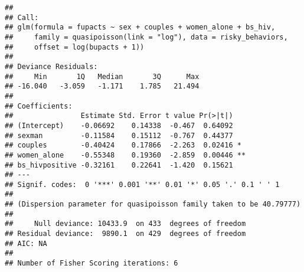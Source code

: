 \documentclass[]{article}
\begin{document}
\begin{verbatim}
## 
## Call:
## glm(formula = fupacts ~ sex + couples + women_alone + bs_hiv, 
##     family = quasipoisson(link = "log"), data = risky_behaviors, 
##     offset = log(bupacts + 1))
## 
## Deviance Residuals: 
##     Min       1Q   Median       3Q      Max  
## -16.040   -3.059   -1.171    1.785   21.494  
## 
## Coefficients:
##                Estimate Std. Error t value Pr(>|t|)   
## (Intercept)    -0.06692    0.14338  -0.467  0.64092   
## sexman         -0.11584    0.15112  -0.767  0.44377   
## couples        -0.40424    0.17866  -2.263  0.02416 * 
## women_alone    -0.55348    0.19360  -2.859  0.00446 **
## bs_hivpositive -0.32161    0.22641  -1.420  0.15621   
## ---
## Signif. codes:  0 '***' 0.001 '**' 0.01 '*' 0.05 '.' 0.1 ' ' 1
## 
## (Dispersion parameter for quasipoisson family taken to be 40.79777)
## 
##     Null deviance: 10433.9  on 433  degrees of freedom
## Residual deviance:  9890.1  on 429  degrees of freedom
## AIC: NA
## 
## Number of Fisher Scoring iterations: 6
\end{verbatim}
\end{document}

